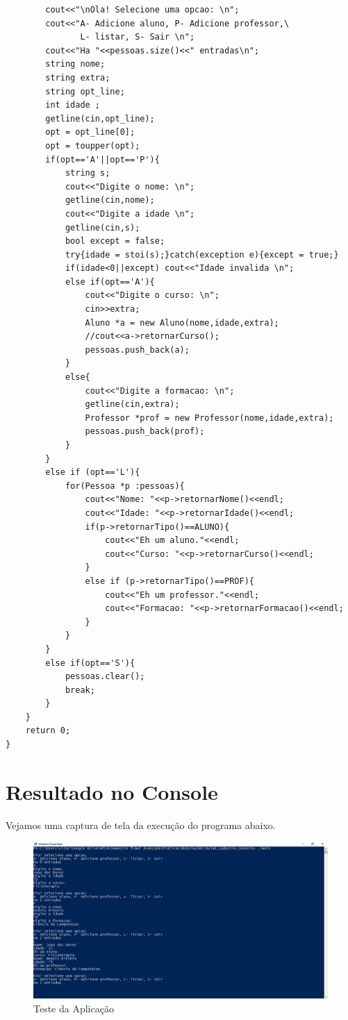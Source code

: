 \documentclass[12pt,a4paper]{article}
\begin{document}
\begin{verbatim}
        cout<<"\nOla! Selecione uma opcao: \n";
        cout<<"A- Adicione aluno, P- Adicione professor,\
               L- listar, S- Sair \n";
        cout<<"Ha "<<pessoas.size()<<" entradas\n";
        string nome;
        string extra;
        string opt_line;
        int idade ;
        getline(cin,opt_line);
        opt = opt_line[0];
        opt = toupper(opt);
        if(opt=='A'||opt=='P'){
            string s;
            cout<<"Digite o nome: \n";
            getline(cin,nome);
            cout<<"Digite a idade \n";
            getline(cin,s);
            bool except = false;
            try{idade = stoi(s);}catch(exception e){except = true;}
            if(idade<0||except) cout<<"Idade invalida \n";
            else if(opt=='A'){
                cout<<"Digite o curso: \n";
                cin>>extra;
                Aluno *a = new Aluno(nome,idade,extra);
                //cout<<a->retornarCurso();
                pessoas.push_back(a);
            }
            else{
                cout<<"Digite a formacao: \n";
                getline(cin,extra);
                Professor *prof = new Professor(nome,idade,extra);
                pessoas.push_back(prof);
            }
        }
        else if (opt=='L'){
            for(Pessoa *p :pessoas){
                cout<<"Nome: "<<p->retornarNome()<<endl;
                cout<<"Idade: "<<p->retornarIdade()<<endl;
                if(p->retornarTipo()==ALUNO){
                    cout<<"Eh um aluno."<<endl;
                    cout<<"Curso: "<<p->retornarCurso()<<endl;
                }
                else if (p->retornarTipo()==PROF){
                    cout<<"Eh um professor."<<endl;
                    cout<<"Formacao: "<<p->retornarFormacao()<<endl;
                } 
            }
        } 
        else if(opt=='S'){
            pessoas.clear();
            break;
        }
    }
    return 0;
}
\end{verbatim}

\section{Resultado no Console}

Vejamos uma captura de tela da execução do programa abaixo.
\begin{figure}[H]
	\centering
	\includegraphics[width=\textwidth]{console}
	\caption{Teste da Aplicação}
\end{figure}
\end{document}
